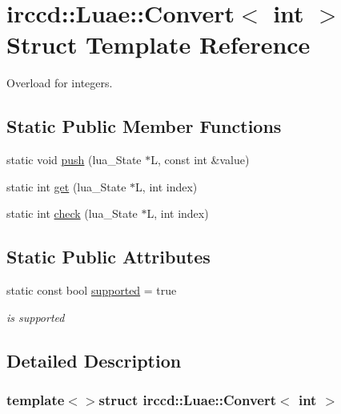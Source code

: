 \hypertarget{a00011}{\section{irccd\-:\-:Luae\-:\-:Convert$<$ int $>$ Struct Template Reference}
\label{a00011}
}


Overload for integers.  


\subsection*{Static Public Member Functions}
\begin{DoxyCompactItemize}
\item 
static void \hyperlink{a00011_a750b404c9e4e0b45c7fd3ec647de96eb}{push} (lua\-\_\-\-State $\ast$L, const int \&value)
\item 
static int \hyperlink{a00011_ae10feb0403abc1dbcc451b72fe6735d1}{get} (lua\-\_\-\-State $\ast$L, int index)
\item 
static int \hyperlink{a00011_a46ab61745e304fc147ecc077f999d980}{check} (lua\-\_\-\-State $\ast$L, int index)
\end{DoxyCompactItemize}
\subsection*{Static Public Attributes}
\begin{DoxyCompactItemize}
\item 
\hypertarget{a00011_ad52e89213953e0df9a176c561a1757cc}{static const bool \hyperlink{a00011_ad52e89213953e0df9a176c561a1757cc}{supported} = true}\label{a00011_ad52e89213953e0df9a176c561a1757cc}

\begin{DoxyCompactList}\small\item\em is supported \end{DoxyCompactList}\end{DoxyCompactItemize}


\subsection{Detailed Description}
\subsubsection*{template$<$$>$struct irccd\-::\-Luae\-::\-Convert$<$ int $>$}

